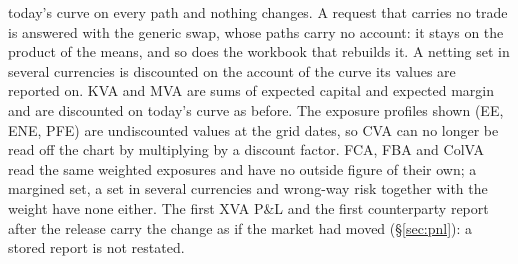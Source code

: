 \documentclass[11pt,a4paper]{article}
\newcommand{\code}[1]{\ifmmode\text{\small\texttt{\detokenize{#1}}}\else{\small\path{#1}}\fi}
\begin{document}
today's curve on every path and nothing changes. A request that carries no trade is answered with the generic swap, whose paths carry no account: it stays on the product of the means, and so does the \code{xva\_rates} workbook that rebuilds it. A netting set in several currencies is discounted on the account of the curve its values are reported on. KVA and MVA are sums of expected capital and expected margin and are discounted on today's curve as before. The exposure profiles shown (EE, ENE, PFE) are undiscounted values at the grid dates, so CVA can no longer be read off the chart by multiplying by a discount factor. FCA, FBA and ColVA read the same weighted exposures and have no outside figure of their own; a margined set, a set in several currencies and wrong-way risk together with the weight have none either. The first XVA P\&L and the first counterparty report after the release carry the change as if the market had moved (\S\ref{sec:pnl}): a stored report is not restated.
\end{document}
